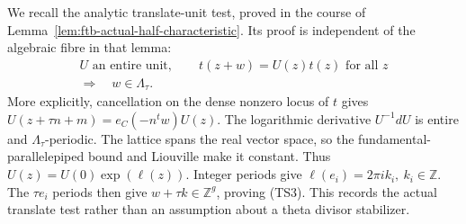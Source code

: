 We recall the analytic translate-unit test, proved in the
course of Lemma~\ref{lem:ftb-actual-half-characteristic}.
Its proof is independent of the algebraic fibre in that
lemma:
\[
 \begin{gathered}
  U\text{ an entire unit},\qquad
  t(z+w)=U(z)t(z)\text{ for all }z\\
                 \Longrightarrow\quad w\in\Lambda_\tau .
 \end{gathered}                                           \tag{TS3}
\]
More explicitly, cancellation on the dense nonzero locus
of \(t\) gives
\(U(z+\tau n+m)=e_C(-n^tw)U(z)\).
The logarithmic derivative \(U^{-1}dU\) is entire and
\(\Lambda_\tau\)-periodic.
The lattice spans the real vector space, so the
fundamental-parallelepiped bound and Liouville make it
constant.  Thus \(U(z)=U(0)\exp(\ell(z))\).
Integer periods give
\(\ell(e_i)=2\pi i k_i,\ k_i\in\mathbb Z\).
The \(\tau e_i\) periods then give
\(w+\tau k\in\mathbb Z^g\), proving (TS3).
This records the actual translate test rather than an
assumption about a theta divisor stabilizer.

